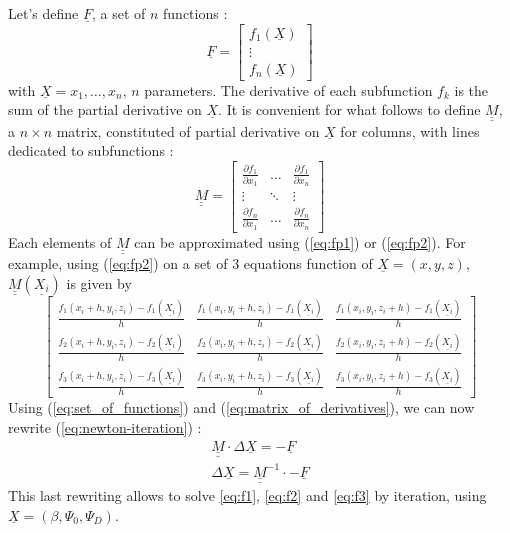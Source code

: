 \documentclass[a4paper]{scrartcl}
\newcommand{\mat}[1]{\underline{\underline{#1}}}
\renewcommand{\vec}[1]{\underline{#1}}
\begin{document}
Let's define $\vec{F}$, a set of $n$ functions :
\begin{equation}
	\vec{F} = \left[ \begin{matrix}
		f_1(\vec{X}) \\ 
		\vdots \\ 
		f_n(\vec{X})
	\end{matrix} \right] 
	\label{eq:set_of_functions}
\end{equation}
with $\vec{X} = x_1, \dots, x_n$, $n$ parameters.
The derivative of each subfunction $f_k$ is the sum of the partial derivative on $\vec{X}$. 
It is convenient for what follows to define $\mat{M}$, a $n \times n$ matrix, constituted of partial derivative on $\vec{X}$ for columns, with lines dedicated to subfunctions :
\begin{equation}
	\mat{M} = \left[ \begin{matrix}
	\frac{\partial f_1}{\partial x_1} & \hdots & \frac{\partial f_1}{\partial x_n} \\ 
	\vdots & \ddots  & \vdots \\ 
	\frac{\partial f_n}{\partial x_1} & \hdots & \frac{\partial f_n}{\partial x_n}
	\end{matrix}  \right] 
	\label{eq:matrix_of_derivatives}
\end{equation}
Each elements of $\mat{M}$ can be approximated using (\ref{eq:fp1}) or (\ref{eq:fp2}). 
For example, using  (\ref{eq:fp2}) on a set of 3 equations function of $\vec{X} = (x, y, z)$, $\mat{M}(\vec{X_i})$  is given by
\begin{equation}
	\left[ \begin{matrix}
	\frac{f_1(x_i + h, y_i, z_i) - f_1(\vec{X_i})}{h} & \frac{ f_1(x_i, y_i + h, z_i) - f_1(\vec{X_i})}{h} & \frac{ f_1(x_i, y_i, z_i + h) - f_1(\vec{X_i})}{h} \\ 
	\frac{ f_2(x_i + h, y_i, z_i) - f_2(\vec{X_i})}{h} & \frac{ f_2(x_i, y_i + h, z_i) - f_2(\vec{X_i})}{h} & \frac{ f_2(x_i, y_i, z_i + h) - f_2(\vec{X_i})}{h} \\ 
	\frac{ f_3(x_i + h, y_i, z_i) - f_3(\vec{X_i})}{h} & \frac{ f_3(x_i, y_i + h, z_i) - f_3(\vec{X_i})}{h} & \frac{ f_3(x_i, y_i, z_i + h) - f_3(\vec{X_i})}{h}
	\end{matrix}    \right]
	\label{eq:matrix_of_derivatives-example} 
\end{equation}
Using (\ref{eq:set_of_functions}) and (\ref{eq:matrix_of_derivatives}), we can now rewrite (\ref{eq:newton-iteration}) :
\begin{gather}
	\mat{M} \cdot \Delta \vec{X} = - \vec{F}
	\label{eq:newton-iteration-matrix1} \\
	\Delta \vec{X} = \mat{M}^{-1} \cdot - \vec{F}
	\label{eq:newton-iteration-matrix2}	
\end{gather}
This last rewriting allows to solve \ref{eq:f1}, \ref{eq:f2} and \ref{eq:f3} by iteration, using $\vec{X} = (\beta, \Psi_0, \Psi_D)$.
\end{document}
